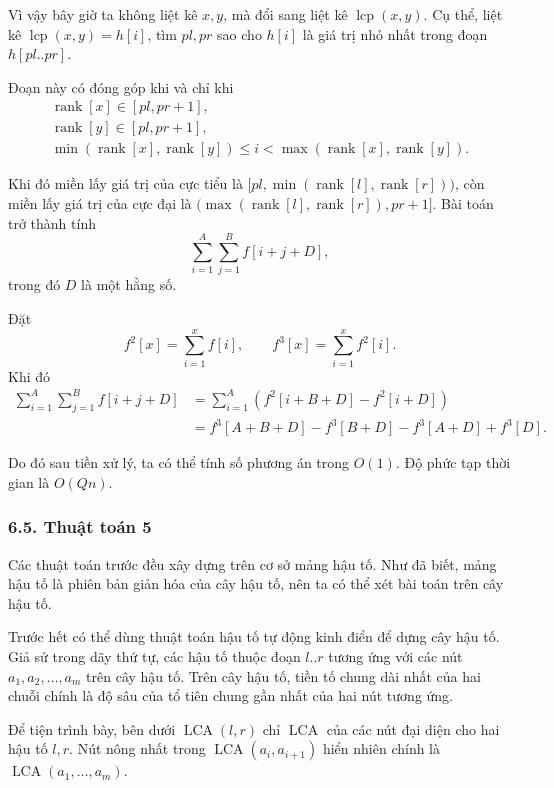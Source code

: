 \documentclass[11pt]{article}
\begin{document}
Vì vậy bây giờ ta không liệt kê \(x,y\), mà đổi sang liệt kê
\(\operatorname{lcp}(x,y)\). Cụ thể, liệt kê \(\operatorname{lcp}(x,y)=h[i]\),
tìm \(pl,pr\) sao cho \(h[i]\) là giá trị nhỏ nhất trong đoạn \(h[pl..pr]\).

Đoạn này có đóng góp khi và chỉ khi
\[
\begin{gathered}
  \operatorname{rank}[x]\in[pl,pr+1],\\
  \operatorname{rank}[y]\in[pl,pr+1],\\
  \min(\operatorname{rank}[x],\operatorname{rank}[y])
  \le i<
  \max(\operatorname{rank}[x],\operatorname{rank}[y]).
\end{gathered}
\]

Khi đó miền lấy giá trị của cực tiểu là
\([pl,\min(\operatorname{rank}[l],\operatorname{rank}[r]))\), còn miền lấy
giá trị của cực đại là
\((\max(\operatorname{rank}[l],\operatorname{rank}[r]),pr+1]\). Bài toán trở
thành tính
\[
  \sum_{i=1}^{A}\sum_{j=1}^{B} f[i+j+D],
\]
trong đó \(D\) là một hằng số.

Đặt
\[
  f^2[x]=\sum_{i=1}^{x} f[i],
  \qquad
  f^3[x]=\sum_{i=1}^{x} f^2[i].
\]
Khi đó
\[
\begin{aligned}
  \sum_{i=1}^{A}\sum_{j=1}^{B} f[i+j+D]
  &=\sum_{i=1}^{A}\left(f^2[i+B+D]-f^2[i+D]\right)\\
  &=f^3[A+B+D]-f^3[B+D]-f^3[A+D]+f^3[D].
\end{aligned}
\]

Do đó sau tiền xử lý, ta có thể tính số phương án trong \(O(1)\). Độ phức tạp
thời gian là \(O(Qn)\).

\subsubsection*{6.5. Thuật toán 5}

Các thuật toán trước đều xây dựng trên cơ sở mảng hậu tố. Như đã biết, mảng
hậu tố là phiên bản giản hóa của cây hậu tố, nên ta có thể xét bài toán trên
cây hậu tố.

Trước hết có thể dùng thuật toán hậu tố tự động kinh điển để dựng cây hậu tố.
Giả sử trong dãy thứ tự, các hậu tố thuộc đoạn \(l..r\) tương ứng với các nút
\(a_1,a_2,\ldots,a_m\) trên cây hậu tố. Trên cây hậu tố, tiền tố chung dài
nhất của hai chuỗi chính là độ sâu của tổ tiên chung gần nhất của hai nút
tương ứng.

Để tiện trình bày, bên dưới \(\operatorname{LCA}(l,r)\) chỉ
\(\operatorname{LCA}\) của các nút đại diện cho hai hậu tố \(l,r\). Nút nông
nhất trong \(\operatorname{LCA}(a_i,a_{i+1})\) hiển nhiên chính là
\(\operatorname{LCA}(a_1,\ldots,a_m)\).
\end{document}
